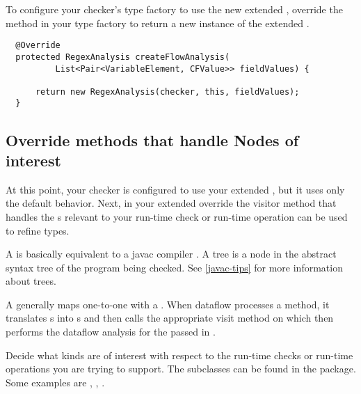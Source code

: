 \begin{enumerate}
To configure your checker's type factory to use the new extended
, override the
 method in your type factory to return a new instance
of the extended .

\begin{smaller}
\begin{Verbatim}
  @Override
  protected RegexAnalysis createFlowAnalysis(
          List<Pair<VariableElement, CFValue>> fieldValues) {

      return new RegexAnalysis(checker, this, fieldValues);
  }
\end{Verbatim}
\end{smaller}

\end{enumerate}

\subsection{Override methods that handle Nodes of
interest\label{dataflow-override-methods}}

At this point, your checker is configured to use your extended
, but it uses only the default
behavior. Next, in your extended 
override the visitor method that handles the s
relevant to your run-time check or run-time operation can be used to refine
types.

A  is basically equivalent to a javac compiler
.  A tree is a node in the abstract syntax tree of the
program being checked. See \ref{javac-tips} for more information about trees.

A  generally maps one-to-one with a
. When dataflow processes a method, it translates
s into s and then
calls the appropriate visit method on
 which then performs the dataflow
analysis for the passed in .

Decide what  kinds are of interest with
respect to the run-time checks or run-time operations you are trying to support.
The  subclasses can be found in the
 package.  Some examples are
,
,
.

